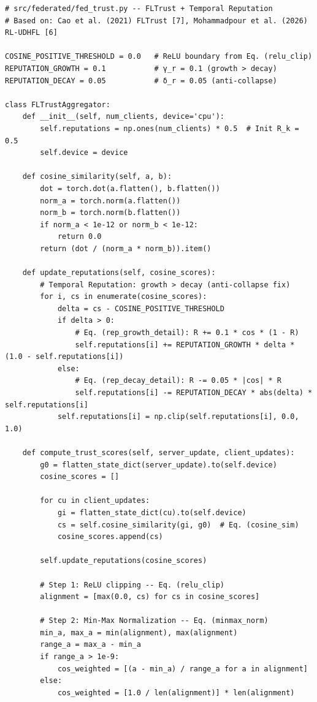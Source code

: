 \documentclass[12pt,a4paper]{article}
\begin{document}
\begin{lstlisting}[caption=FLTrust with Temporal Reputation, label=lst:fltrust]
# src/federated/fed_trust.py -- FLTrust + Temporal Reputation
# Based on: Cao et al. (2021) FLTrust [7], Mohammadpour et al. (2026) RL-UDHFL [6]

COSINE_POSITIVE_THRESHOLD = 0.0   # ReLU boundary from Eq. (relu_clip)
REPUTATION_GROWTH = 0.1           # γ_r = 0.1 (growth > decay)
REPUTATION_DECAY = 0.05           # δ_r = 0.05 (anti-collapse)

class FLTrustAggregator:
    def __init__(self, num_clients, device='cpu'):
        self.reputations = np.ones(num_clients) * 0.5  # Init R_k = 0.5
        self.device = device

    def cosine_similarity(self, a, b):
        dot = torch.dot(a.flatten(), b.flatten())
        norm_a = torch.norm(a.flatten())
        norm_b = torch.norm(b.flatten())
        if norm_a < 1e-12 or norm_b < 1e-12:
            return 0.0
        return (dot / (norm_a * norm_b)).item()

    def update_reputations(self, cosine_scores):
        # Temporal Reputation: growth > decay (anti-collapse fix)
        for i, cs in enumerate(cosine_scores):
            delta = cs - COSINE_POSITIVE_THRESHOLD
            if delta > 0:
                # Eq. (rep_growth_detail): R += 0.1 * cos * (1 - R)
                self.reputations[i] += REPUTATION_GROWTH * delta * (1.0 - self.reputations[i])
            else:
                # Eq. (rep_decay_detail): R -= 0.05 * |cos| * R
                self.reputations[i] -= REPUTATION_DECAY * abs(delta) * self.reputations[i]
            self.reputations[i] = np.clip(self.reputations[i], 0.0, 1.0)

    def compute_trust_scores(self, server_update, client_updates):
        g0 = flatten_state_dict(server_update).to(self.device)
        cosine_scores = []

        for cu in client_updates:
            gi = flatten_state_dict(cu).to(self.device)
            cs = self.cosine_similarity(gi, g0)  # Eq. (cosine_sim)
            cosine_scores.append(cs)

        self.update_reputations(cosine_scores)

        # Step 1: ReLU clipping -- Eq. (relu_clip)
        alignment = [max(0.0, cs) for cs in cosine_scores]

        # Step 2: Min-Max Normalization -- Eq. (minmax_norm)
        min_a, max_a = min(alignment), max(alignment)
        range_a = max_a - min_a
        if range_a > 1e-9:
            cos_weighted = [(a - min_a) / range_a for a in alignment]
        else:
            cos_weighted = [1.0 / len(alignment)] * len(alignment)


\end{lstlisting}
\end{document}
